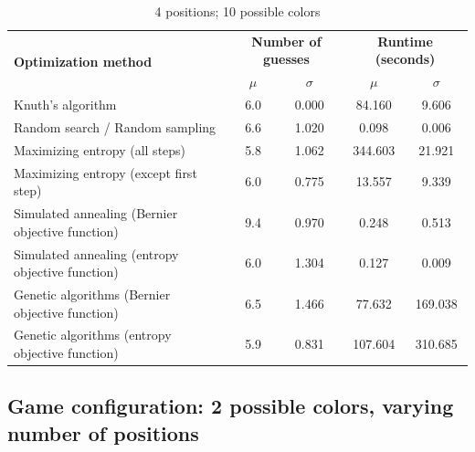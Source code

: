\documentclass[11pt]{article}
\begin{document}
\begin{table}[h!]
\begin{center}
\begin{tabular}{l c c c c}
\toprule
\multirow{2}{*}{\bfseries Optimization method} 		& \multicolumn{2}{c}{\bfseries Number of guesses} 		& \multicolumn{2}{c}{\bfseries Runtime (seconds)}	\\
\cmidrule(lr){2-3}  \cmidrule(lr){4-5}				& $\mu$ & $\sigma$								& $\mu$ & $\sigma$							\\
\cmidrule(lr){1-5}
Knuth's algorithm							& 6.0 & 0.000									& 84.160 & 9.606							\\
Random search / Random sampling				& 6.6 & 1.020									& 0.098 & 0.006							\\
Maximizing entropy (all steps)					& 5.8 & 1.062									& 344.603 & 21.921							\\
Maximizing entropy (except first step)			& 6.0 & 0.775									& 13.557 & 9.339							\\
Simulated annealing (Bernier objective function)	& 9.4 & 0.970									& 0.248 & 0.513							\\
Simulated annealing (entropy objective function)	& 6.0 & 1.304									& 0.127 & 0.009							\\
Genetic algorithms (Bernier objective function)		& 6.5 & 1.466									& 77.632 & 169.038							\\
Genetic algorithms (entropy objective function)		& 5.9 & 0.831									& 107.604 & 310.685						\\
\bottomrule
\end{tabular}
\end{center}
\caption{4 positions; 10 possible colors}
\label{fig:compare_4_10}
\end{table}

\newpage

\subsection*{Game configuration: 2 possible colors, varying number of positions}
\end{document}

